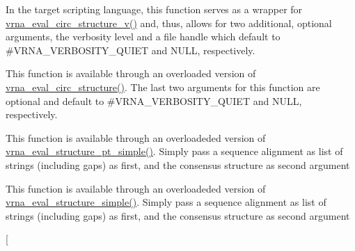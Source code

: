 \begin{DoxyRefList}
\item[\label{wrappers__wrappers000036}%
\Hypertarget{wrappers__wrappers000036}%
Global \hyperlink{group__eval_ga3e05a23ddf9b083f4e69881e440d4866}{vrna\+\_\+eval\+\_\+circ\+\_\+structure} (const char $\ast$string, const char $\ast$structure)]In the target scripting language, this function serves as a wrapper for \hyperlink{group__eval_gac3fb44e0773a51be8efc5f4f595a94a7}{vrna\+\_\+eval\+\_\+circ\+\_\+structure\+\_\+v()} and, thus, allows for two additional, optional arguments, the verbosity level and a file handle which default to \#\+V\+R\+N\+A\+\_\+\+V\+E\+R\+B\+O\+S\+I\+T\+Y\+\_\+\+Q\+U\+I\+ET and N\+U\+LL, respectively.  
\item[\label{wrappers__wrappers000046}%
\Hypertarget{wrappers__wrappers000046}%
Global \hyperlink{group__eval_gac3fb44e0773a51be8efc5f4f595a94a7}{vrna\+\_\+eval\+\_\+circ\+\_\+structure\+\_\+v} (const char $\ast$string, const char $\ast$structure, int verbosity\+\_\+level, F\+I\+LE $\ast$file)]This function is available through an overloaded version of \hyperlink{group__eval_ga3e05a23ddf9b083f4e69881e440d4866}{vrna\+\_\+eval\+\_\+circ\+\_\+structure()}. The last two arguments for this function are optional and default to \#\+V\+R\+N\+A\+\_\+\+V\+E\+R\+B\+O\+S\+I\+T\+Y\+\_\+\+Q\+U\+I\+ET and N\+U\+LL, respectively.  
\item[\label{wrappers__wrappers000054}%
\Hypertarget{wrappers__wrappers000054}%
Global \hyperlink{group__eval_gabbb4d2a7aa324ec9cce8f47ce61ab8af}{vrna\+\_\+eval\+\_\+consensus\+\_\+structure\+\_\+pt\+\_\+simple} (const char $\ast$$\ast$alignment, const short $\ast$pt)]This function is available through an overloadeded version of \hyperlink{group__eval_ga0bba59b4d6e53461088666ff4aece7b0}{vrna\+\_\+eval\+\_\+structure\+\_\+pt\+\_\+simple()}. Simply pass a sequence alignment as list of strings (including gaps) as first, and the consensus structure as second argument  
\item[\label{wrappers__wrappers000039}%
\Hypertarget{wrappers__wrappers000039}%
Global \hyperlink{group__eval_ga7762c3a7bdcbc3a14ef93259d322c7d6}{vrna\+\_\+eval\+\_\+consensus\+\_\+structure\+\_\+simple} (const char $\ast$$\ast$alignment, const char $\ast$structure)]This function is available through an overloadeded version of \hyperlink{group__eval_ga7e5273464b775d4130245681312c1369}{vrna\+\_\+eval\+\_\+structure\+\_\+simple()}. Simply pass a sequence alignment as list of strings (including gaps) as first, and the consensus structure as second argument  
\item[\label{wrappers__wrappers000049}%

\end{DoxyRefList}
